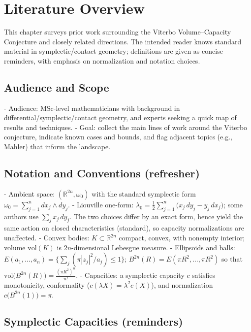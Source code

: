 \chapter{Literature Overview}
\label{chap:literature-overview}

This chapter surveys prior work surrounding the Viterbo Volume--Capacity Conjecture\cite{Viterbo2000} and closely
related directions. The intended reader knows standard material in symplectic/contact geometry;
definitions are given as concise reminders, with emphasis on normalization and notation choices.

\section*{Audience and Scope}

- Audience: MSc-level mathematicians with background in differential/symplectic/contact geometry,
  and experts seeking a quick map of results and techniques.
- Goal: collect the main lines of work around the Viterbo conjecture, indicate known cases and
  bounds, and flag adjacent topics (e.g., Mahler) that inform the landscape.

\section*{Notation and Conventions (refresher)}

- Ambient space: $(\mathbb{R}^{2n},\omega_0)$ with the standard symplectic form
  $\omega_0 = \sum_{j=1}^n dx_j \wedge dy_j$.
- Liouville one-form: $\lambda_0 = \tfrac{1}{2}\sum_{j=1}^n\bigl(x_j\,dy_j - y_j\,dx_j\bigr)$; some
  authors use $\sum_j x_j\,dy_j$. The two choices differ by an exact form, hence yield the same
  action on closed characteristics (standard), so capacity normalizations are unaffected\cite{CHLS2007}.
- Convex bodies: $K \subset \mathbb{R}^{2n}$ compact, convex, with nonempty interior;\quad
  volume $\mathrm{vol}(K)$ is $2n$-dimensional Lebesgue measure.
- Ellipsoids and balls: $E(a_1,\dots,a_n)=\{\sum_j (\pi |z_j|^2/a_j)\le 1\}$;\quad
  $B^{2n}(R)=E(\pi R^2,\dots,\pi R^2)$ so that $\mathrm{vol}\bigl(B^{2n}(R)\bigr)=\frac{(\pi R^2)^n}{n!}$.
- Capacities: a symplectic capacity $c$ satisfies monotonicity, conformality ($c(\lambda X)=\lambda^2 c(X)$),
  and normalization $c\bigl(B^{2n}(1)\bigr)=\pi$.

\section{Symplectic Capacities (reminders)}


